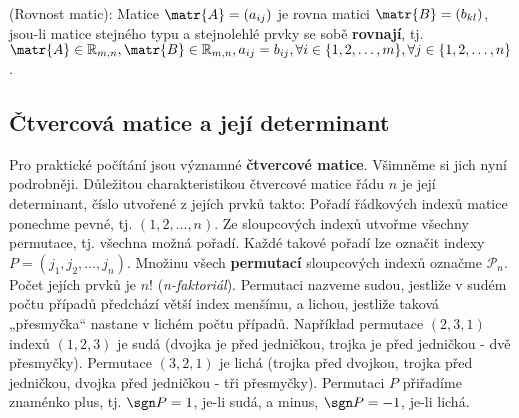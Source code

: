       \begin{definition}\label{rovnost_matic}
        (Rovnost matic):  Matice \(\matr{A} = \left(a_{ij}\right)\) je rovna matici \(\matr{B}=
        \left(b_{kl}\right)\), jsou-li matice stejného typu a stejnolehlé prvky se sobě
        \textbf{rovnají}, tj. \(\matr{A} \in \mathbb{R}_{m,n}, \matr{B}\in\mathbb{R}_{m,n}, 
        a_{ij} = b_{ij}, \forall i\in\lbrace1,2,\ldots,m\rbrace, \forall j\in\lbrace1,2, \ldots 
        ,n\rbrace\).
      \end{definition}

    \subsection{Čtvercová matice a její determinant}\label{mai:IchapIIsecIIIsubIV}
      Pro praktické počítání jsou významné \textbf{čtvercové matice}. Všimněme si jich nyní
      podrobněji. Důležitou charakteristikou čtvercové matice řádu \(n\) je její determinant, číslo
      utvořené z jejích prvků takto: Pořadí řádkových indexů matice ponechme pevné, tj. \((1,2,...,
      n)\). Ze sloupcových indexů utvořme všechny permutace, tj. všechna možná pořadí. Každé takové
      pořadí lze označit indexy \(P = (j_1, j_2, \ldots, j_n)\). Množinu všech \textbf{permutací}
      sloupcových indexů označme \(\mathcal{P}_n\). Počet jejích prvků je \(n!\)
      (\emph{n-faktoriál}). Permutaci nazveme sudou, jestliže v sudém počtu případů předchází větší
      index menšímu, a lichou, jestliže taková „přesmyčka“ nastane v lichém počtu případů. Například
      permutace \((2,3,1)\) indexů \((1,2,3)\) je sudá (dvojka je před jedničkou, trojka je před
      jedničkou - dvě přesmyčky). Permutace \((3,2,1)\) je lichá (trojka před dvojkou, trojka před
      jedničkou, dvojka před jedničkou - tři přesmyčky). Permutaci \(P\) přiřadíme znaménko plus,
      tj. \(\sgn P = 1\), je-li sudá, a minus, \(\sgn P = -1\), je-li lichá.

